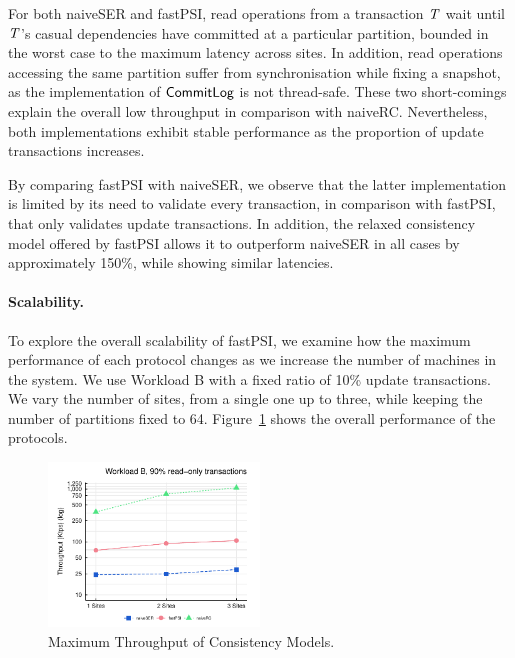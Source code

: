 For both naiveSER and fastPSI, read operations from a transaction $\mathit{T}$ wait until $\mathit{T}$'s casual dependencies have committed at a particular partition, bounded in the worst case to the maximum latency across sites. In addition, read operations accessing the same partition suffer from synchronisation while fixing a snapshot, as the implementation of $\mathsf{CommitLog}$ is not thread-safe. These two short-comings explain the overall low throughput in comparison with naiveRC. Nevertheless, both implementations exhibit stable performance as the proportion of update transactions increases.

By comparing fastPSI with naiveSER, we observe that the latter implementation is limited by its need to validate every transaction, in comparison with fastPSI, that only validates update transactions. In addition, the relaxed consistency model offered by fastPSI allows it to outperform naiveSER in all cases by approximately 150\%, while showing similar latencies.

\paragraph{Scalability.} To explore the overall scalability of fastPSI, we examine how the maximum performance of each protocol changes as we increase the number of machines in the system. We use Workload B with a fixed ratio of 10\% update transactions. We vary the number of sites, from a single one up to three, while keeping the number of partitions fixed to 64. Figure~\ref{fig:site_bench} shows the overall performance of the protocols.

\begin{figure}[h]
\begin{center}
\includegraphics[width=0.5\textwidth]{figures/sites_bench.pdf}
\vspace{-1cm}
\end{center}
\caption{Maximum Throughput of Consistency Models.}
\label{fig:site_bench}
\end{figure}

